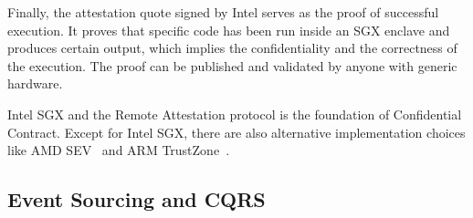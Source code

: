 Finally, the attestation quote signed by Intel serves as the proof of successful execution. It proves that specific code has been run inside an SGX enclave and produces certain output, which implies the confidentiality and the correctness of the execution. The proof can be published and validated by anyone with generic hardware.

Intel SGX and the Remote Attestation protocol is the foundation of Confidential Contract. Except for Intel SGX, there are also alternative implementation choices like AMD SEV~\cite{xxx} and ARM TrustZone~\cite{xxx}.

\subsection{Event Sourcing and CQRS}


